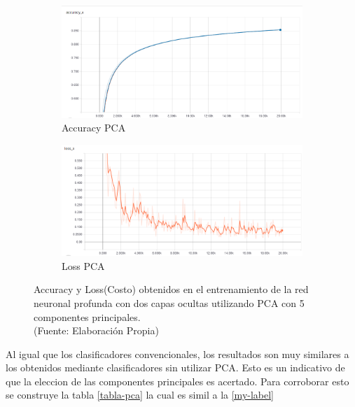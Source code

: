 \begin{figure}[ht!]
\centering
\begin{subfigure}{.5\textwidth}
  \centering
  \includegraphics[width=.8\linewidth]{figures/nn_plot_pca.png}
  \caption{Accuracy PCA}
  \label{fig:sub1}
\end{subfigure}%
\begin{subfigure}{.5\textwidth}
  \centering
  \includegraphics[width=.8\linewidth]{figures/nn_loss_pca.png}
  \caption{Loss PCA}
  \label{fig:sub2}
\end{subfigure}
\caption[abs]{Accuracy y Loss(Costo) obtenidos en el entrenamiento de la red neuronal profunda con dos capas ocultas utilizando PCA con 5 componentes principales. \\
{\scriptsize (Fuente: Elaboración Propia)}}
\label{fig:nn_metrics_pca}
\end{figure}

Al igual que los clasificadores convencionales, los resultados son muy similares a los obtenidos mediante clasificadores sin utilizar PCA. Esto es un indicativo de que la eleccion de las componentes principales es acertado. Para corroborar esto se construye la tabla \autoref{tabla-pca} la cual es simil a la \autoref{my-label}

